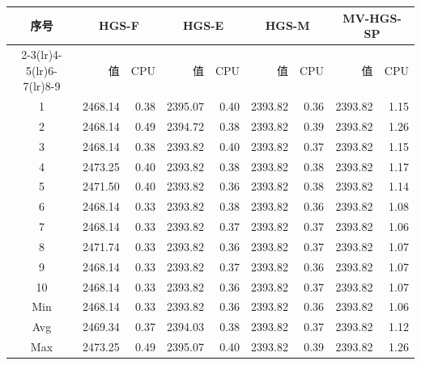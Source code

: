 \begin{tabular}{c*{8}{r}}
\toprule
\multirow{2}{*}{序号} & \multicolumn{2}{c}{HGS-F} & \multicolumn{2}{c}{HGS-E} & \multicolumn{2}{c}{HGS-M} & \multicolumn{2}{c}{MV-HGS-SP}\\
\cmidrule(lr){2-3}\cmidrule(lr){4-5}\cmidrule(lr){6-7}\cmidrule(lr){8-9}
 & 值 & CPU & 值 & CPU & 值 & CPU & 值 & CPU\\
\midrule
1 & 2468.14 & 0.38 & 2395.07 & 0.40 & 2393.82 & 0.36 & 2393.82 & 1.15\\
2 & 2468.14 & 0.49 & 2394.72 & 0.38 & 2393.82 & 0.39 & 2393.82 & 1.26\\
3 & 2468.14 & 0.38 & 2393.82 & 0.40 & 2393.82 & 0.37 & 2393.82 & 1.15\\
4 & 2473.25 & 0.40 & 2393.82 & 0.38 & 2393.82 & 0.38 & 2393.82 & 1.17\\
5 & 2471.50 & 0.40 & 2393.82 & 0.36 & 2393.82 & 0.38 & 2393.82 & 1.14\\
6 & 2468.14 & 0.33 & 2393.82 & 0.38 & 2393.82 & 0.36 & 2393.82 & 1.08\\
7 & 2468.14 & 0.33 & 2393.82 & 0.37 & 2393.82 & 0.37 & 2393.82 & 1.06\\
8 & 2471.74 & 0.33 & 2393.82 & 0.36 & 2393.82 & 0.37 & 2393.82 & 1.07\\
9 & 2468.14 & 0.33 & 2393.82 & 0.37 & 2393.82 & 0.36 & 2393.82 & 1.07\\
10 & 2468.14 & 0.33 & 2393.82 & 0.36 & 2393.82 & 0.37 & 2393.82 & 1.07\\
Min & 2468.14 & 0.33 & 2393.82 & 0.36 & 2393.82 & 0.36 & 2393.82 & 1.06\\
Avg & 2469.34 & 0.37 & 2394.03 & 0.38 & 2393.82 & 0.37 & 2393.82 & 1.12\\
Max & 2473.25 & 0.49 & 2395.07 & 0.40 & 2393.82 & 0.39 & 2393.82 & 1.26\\
\bottomrule
\end{tabular}
